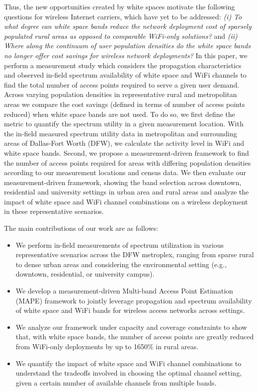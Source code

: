 Thus, the new opportunities created by white spaces motivate the following 
questions for wireless Internet carriers, which have yet to be addressed: 
{\it (i) To what degree can white space bands reduce the network deployment cost of
sparsely populated rural areas as opposed to comparable WiFi-only solutions?} and 
{\it (ii) Where along the continuum of user population densities do the white
space bands no longer offer cost savings for wireless network deployments?}
In this paper, we perform a measurement study which considers the propagation 
characteristics and observed in-field spectrum availability of white space
and WiFi channels to find the total number of access points required to serve a 
given user demand. Across varying population densities in representative 
rural and metropolitan areas we compare the cost savings (defined in terms of
number of access points reduced) when white space bands are not used.
To do so, we first define the metric to quantify the spectrum utility in a
given measurement location. With the in-field measured spectrum utility data 
in metropolitan and surrounding areas of Dallas-Fort Worth (DFW), we 
calculate the activity level in WiFi and white space bands. Second, we 
propose a measurement-driven framework to find the number of access points required 
for areas with differing population densities according to our measurement locations
and census data. We then evaluate our measurement-driven framework, showing
the band selection across downtown, residential and university settings in
urban area and rural areas and analyze the impact of white space and WiFi
channel combinations on a wireless deployment in these representative scenarios.

The main contributions of our work are as follows:
\begin{itemize}
\item We perform in-field measurements of spectrum utilization in various representative
scenarios across the DFW metroplex, ranging from sparse rural to dense urban areas and 
considering the environmental setting (e.g., downtown, residential, or university campus).
\item We develop a measurement-driven Multi-band Access Point Estimation (MAPE) framework 
to jointly leverage propagation and spectrum availability of white space and WiFi bands 
for wireless access networks across settings.
\item We analyze our framework under capacity and coverage constraints 
to show that, with white space bands, the number of access points are greatly
reduced from WiFi-only deployments by up to 1650\% in rural areas.
\item We quantify the impact of white space and WiFi channel
combinations to understand the tradeoffs involved in choosing the optimal channel setting,
given a certain number of available channels from multiple bands.
\end{itemize}


